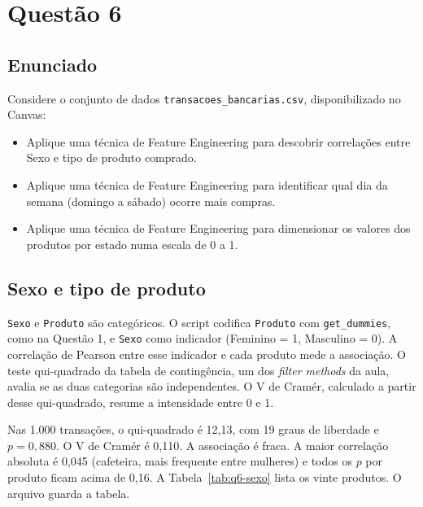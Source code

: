 \section{Questão 6}

\subsection{Enunciado}

Considere o conjunto de dados \texttt{transacoes\_bancarias.csv}, disponibilizado no Canvas:
\begin{itemize}
    \item Aplique uma técnica de Feature Engineering para descobrir correlações entre Sexo e tipo de produto comprado.
    \item Aplique uma técnica de Feature Engineering para identificar qual dia da semana (domingo a sábado) ocorre mais compras.
    \item Aplique uma técnica de Feature Engineering para dimensionar os valores dos produtos por estado numa escala de 0 a 1.
\end{itemize}

\subsection{Sexo e tipo de produto}

\texttt{Sexo} e \texttt{Produto} são categóricos. O script codifica \texttt{Produto} com \texttt{get\_dummies}, como na Questão 1, e \texttt{Sexo} como indicador (Feminino = 1, Masculino = 0). A correlação de Pearson entre esse indicador e cada produto mede a associação. O teste qui-quadrado da tabela de contingência, um dos \textit{filter methods} da aula, avalia se as duas categorias são independentes. O V de Cramér, calculado a partir desse qui-quadrado, resume a intensidade entre 0 e 1.

Nas 1.000 transações, o qui-quadrado é 12,13, com 19 graus de liberdade e \(p = 0{,}880\). O V de Cramér é 0,110. A associação é fraca. A maior correlação absoluta é 0,045 (cafeteira, mais frequente entre mulheres) e todos os \(p\) por produto ficam acima de 0,16. A Tabela~\ref{tab:q6-sexo} lista os vinte produtos. O arquivo  guarda a tabela.


